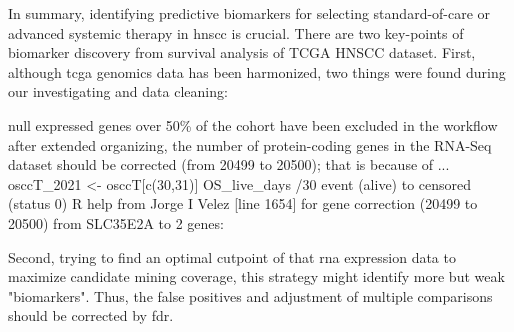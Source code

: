 \documentclass[jpm,article,submit,moreauthors,pdftex]{Definitions/mdpi}
\newenvironment{MyColorPar}[1]{%
    \leavevmode\color{#1}\ignorespaces%
}{%
}%
\begin{document}
In summary, identifying predictive biomarkers for selecting standard-of-care or advanced systemic therapy\cite{Cristina2019} in \acrshort{hnscc} is crucial.
\begin{MyColorPar}{red} %
There are two key-points of biomarker discovery from survival analysis of TCGA HNSCC dataset.
First, although \acrshort{tcga} genomics data has been harmonized, two things were found during our investigating and data cleaning:

\begin{outline}
\1 null expressed genes over 50\% of the cohort have been excluded in the workflow
\1 after extended organizing, the number of protein-coding genes in the  RNA-Seq dataset should be corrected  (from 20499 to 20500);
%
that is because of ...
osccT\_2021 <- osccT[c(30,31)] %
OS\_live_days /30 %
event (alive) to censored (status 0) %
R help from Jorge I Velez
[line 1654]
for gene correction (20499 to 20500) from SLC35E2A to 2 genes:
\end{outline}


\end{MyColorPar} %

\begin{MyColorPar}{red} %
Second, trying to find an optimal cutpoint of that \acrshort{rna} expression data to maximize candidate mining coverage, this strategy might identify more but weak "biomarkers". 
Thus, the false positives and adjustment of multiple comparisons should be corrected by \acrfull{fdr}.
\end{MyColorPar} %
\end{document}
